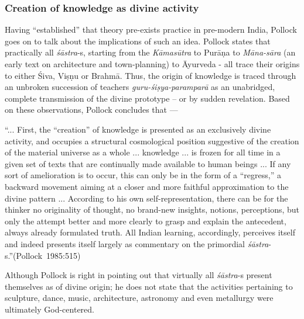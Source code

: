 \subsubsection{Creation of knowledge as divine activity}\label{art12-sec3.8.1}

Having ``established'' that theory pre-exists practice in pre-modern India, Pollock goes on to talk about the implications of such an idea. Pollock states that practically all {\sl śāstra}-s, starting from the {\sl Kāmasūtra} to Purāṇa to {\sl Māna-sāra} (an early text on architecture and town-planning) to Āyurveda - all trace their origins  to either Śiva, Viṣṇu or Brahmā. Thus, the origin of knowledge is traced through an unbroken succession of teachers {\sl guru-śiṣya-paramparā} as an unabridged, complete transmission of the divine prototype -- or by sudden revelation. Based on these observations, Pollock concludes that ---

\begin{myquote}
``... First, the ``creation'' of knowledge is presented as an exclusively divine activity, and occupies a structural cosmological position suggestive of the creation of the material universe as a whole ... knowledge ... is frozen for all time in a given set of texts that are continually made available to human beings ... If any sort of amelioration is to occur, this  can only be in the form of a ``regress,'' a backward movement aiming at a closer and more  faithful approximation to the divine pattern ...  According to his own self-representation, there can be for the thinker no originality of thought, no brand-new insights, notions, perceptions, but only the attempt better and more clearly to grasp and explain the antecedent, always already formulated truth. All Indian learning, accordingly, perceives itself and indeed presents itself largely as commentary on the primordial {\sl śāstra}-s.''\hfill \hbox{(Pollock 1985:515)}
\end{myquote}

\newpage

Although Pollock is right in pointing out that virtually all \hbox{{\sl śāstra}-s} present themselves as of divine origin; he does not state that the activities pertaining to sculpture, dance, music, architecture, astronomy and even metallurgy were ultimately God-centered. 

